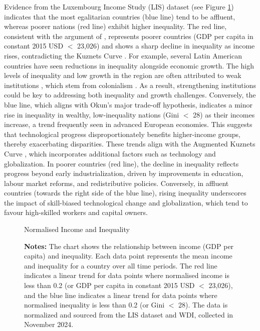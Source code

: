 \documentclass[12pt]{article}
\begin{document}
Evidence from the Luxembourg Income Study (LIS) dataset (see Figure \ref{fig:trend}) indicates that the most egalitarian countries (blue line) tend to be affluent, whereas poorer nations (red line) exhibit higher inequality. The red line, consistent with the argument of \textcite{berg2017inequality}, represents poorer countries (GDP per capita in constant 2015 USD $<$ 23,026) and shows a sharp decline in inequality as income rises, contradicting the Kuznets Curve \parencite*{kuznets1955economic}. For example, several Latin American countries have seen reductions in inequality alongside economic growth. The high levels of inequality and low growth in the region are often attributed to weak institutions \parencite{undp2021trapped}, which stem from colonialism \parencite{coatsworth2008inequality}. As a result, strengthening institutions could be key to addressing both inequality and growth challenges. Conversely, the blue line, which aligns with Okun’s major trade-off hypothesis, indicates a minor rise in inequality in wealthy, low-inequality nations (Gini $<$ 28) as their incomes increase, a trend frequently seen in advanced European economies. This suggests that technological progress disproportionately benefits higher-income groups, thereby exacerbating disparities. These trends align with the Augmented Kuznets Curve \parencite*{conceicao2001toward}, which incorporates additional factors such as technology and globalization. In poorer countries (red line), the decline in inequality reflects progress beyond early industrialization, driven by improvements in education, labour market reforms, and redistributive policies. Conversely, in affluent countries (towards the right side of the blue line), rising inequality underscores the impact of skill-biased technological change and globalization, which tend to favour high-skilled workers and capital owners.

\begin{figure}[H]
    \centering
    \scalebox{0.65}{}
    \caption{Normalised Income and Inequality}
    \label{fig:trend}
    \captionsetup{font=footnotesize}
    \caption*{\textbf{Notes:} The chart shows the relationship between income (GDP per capita) and inequality. Each data point represents the mean income and inequality for a country over all time periods. The red line indicates a linear trend for data points where normalised income is less than 0.2 (or GDP per capita in constant 2015 USD $<$ 23,026), and the blue line indicates a linear trend for data points where normalised inequality is less than 0.2 (or Gini $<$ 28). The data is normalized and sourced from the LIS dataset and WDI, collected in November 2024.}
\end{figure}
\end{document}
